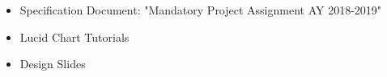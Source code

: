\begin{itemize}
\item Specification Document: "Mandatory Project Assignment AY 2018-2019"
\item Lucid Chart Tutorials 
\item Design Slides
\end{itemize}